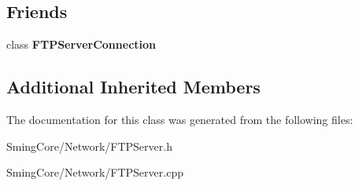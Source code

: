 \subsection*{Friends}
\begin{DoxyCompactItemize}
\item 
\hypertarget{class_f_t_p_server_a488b1abba79677c92b11c9b75f74bb53}{}class {\bfseries F\+T\+P\+Server\+Connection}\label{class_f_t_p_server_a488b1abba79677c92b11c9b75f74bb53}

\end{DoxyCompactItemize}
\subsection*{Additional Inherited Members}


The documentation for this class was generated from the following files\+:\begin{DoxyCompactItemize}
\item 
Sming\+Core/\+Network/F\+T\+P\+Server.\+h\item 
Sming\+Core/\+Network/F\+T\+P\+Server.\+cpp\end{DoxyCompactItemize}
